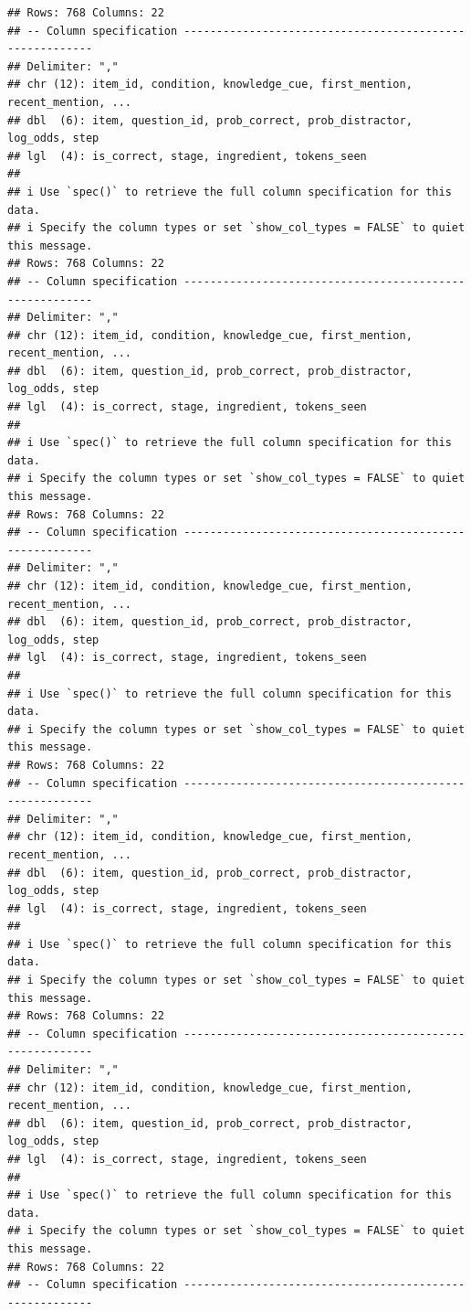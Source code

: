 \documentclass[
]{article}
\begin{document}
\begin{verbatim}
## Rows: 768 Columns: 22
## -- Column specification --------------------------------------------------------
## Delimiter: ","
## chr (12): item_id, condition, knowledge_cue, first_mention, recent_mention, ...
## dbl  (6): item, question_id, prob_correct, prob_distractor, log_odds, step
## lgl  (4): is_correct, stage, ingredient, tokens_seen
## 
## i Use `spec()` to retrieve the full column specification for this data.
## i Specify the column types or set `show_col_types = FALSE` to quiet this message.
## Rows: 768 Columns: 22
## -- Column specification --------------------------------------------------------
## Delimiter: ","
## chr (12): item_id, condition, knowledge_cue, first_mention, recent_mention, ...
## dbl  (6): item, question_id, prob_correct, prob_distractor, log_odds, step
## lgl  (4): is_correct, stage, ingredient, tokens_seen
## 
## i Use `spec()` to retrieve the full column specification for this data.
## i Specify the column types or set `show_col_types = FALSE` to quiet this message.
## Rows: 768 Columns: 22
## -- Column specification --------------------------------------------------------
## Delimiter: ","
## chr (12): item_id, condition, knowledge_cue, first_mention, recent_mention, ...
## dbl  (6): item, question_id, prob_correct, prob_distractor, log_odds, step
## lgl  (4): is_correct, stage, ingredient, tokens_seen
## 
## i Use `spec()` to retrieve the full column specification for this data.
## i Specify the column types or set `show_col_types = FALSE` to quiet this message.
## Rows: 768 Columns: 22
## -- Column specification --------------------------------------------------------
## Delimiter: ","
## chr (12): item_id, condition, knowledge_cue, first_mention, recent_mention, ...
## dbl  (6): item, question_id, prob_correct, prob_distractor, log_odds, step
## lgl  (4): is_correct, stage, ingredient, tokens_seen
## 
## i Use `spec()` to retrieve the full column specification for this data.
## i Specify the column types or set `show_col_types = FALSE` to quiet this message.
## Rows: 768 Columns: 22
## -- Column specification --------------------------------------------------------
## Delimiter: ","
## chr (12): item_id, condition, knowledge_cue, first_mention, recent_mention, ...
## dbl  (6): item, question_id, prob_correct, prob_distractor, log_odds, step
## lgl  (4): is_correct, stage, ingredient, tokens_seen
## 
## i Use `spec()` to retrieve the full column specification for this data.
## i Specify the column types or set `show_col_types = FALSE` to quiet this message.
## Rows: 768 Columns: 22
## -- Column specification --------------------------------------------------------

\end{verbatim}
\end{document}
